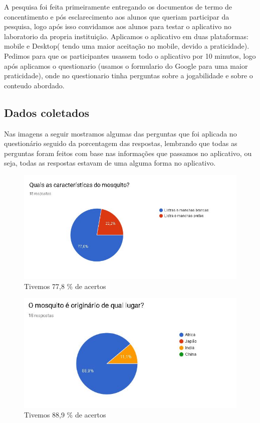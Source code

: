 \documentclass[12pt]{article}
\begin{document}
		A pesquisa foi feita primeiramente entregando os documentos de termo de concentimento e pós esclarecimento aos alunos que queriam participar da pesquisa, logo após isso convidamos aos alunos para testar o aplicativo no laboratorio da propria instituição. Aplicamos o aplicativo em duas plataformas: mobile e Desktop( tendo uma maior aceitação no mobile, devido a praticidade). Pedimos para que os participantes usassem todo o aplicativo por 10 minutos, logo após aplicamos o questionario (usamos o formulario do Google para uma maior praticidade), onde no questionario tinha perguntas sobre a jogabilidade e sobre o conteudo abordado.\\
		
		
		
		
	\subsection{Dados coletados} %
		Nas imagens a seguir mostramos algumas das perguntas que foi aplicada no questionário seguido da porcentagem das respostas, lembrando que todas as perguntas foram feitos com base nas informações que passamos no aplicativo, ou seja, todas as respostas estavam de uma alguma forma no aplicativo. 
		
		\begin{figure}
			\centering
			\caption{Tivemos 77,8 \% de acertos}
			\includegraphics[width=0.7\linewidth]{Figuras/Pergunta_1}
			
			\label{fig:pergunta1}
		\end{figure}
	
		\begin{figure}
			\centering
			\caption{Tivemos 88,9 \% de acertos}
			\includegraphics[width=0.7\linewidth]{Figuras/Pergunta_2}
			
			\label{fig:pergunta2}
		\end{figure}
		
\end{document}

